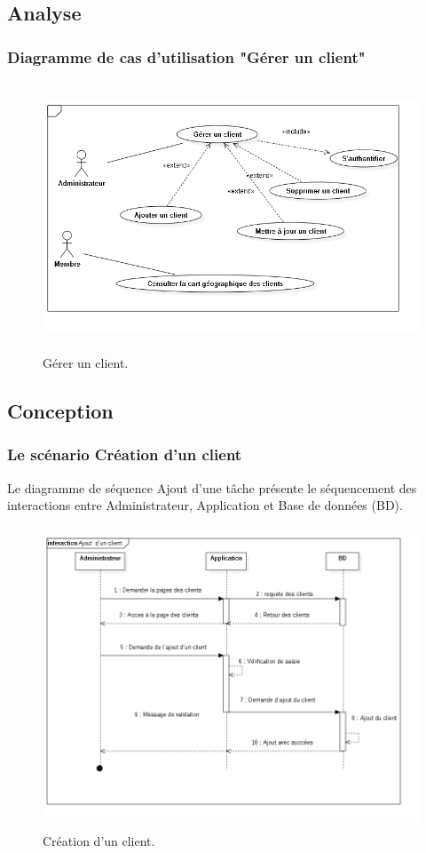 
\subsection{Analyse}
\subsubsection{ Diagramme de cas d'utilisation "G\'{e}rer un client"}
\begin{figure}[H]
\center
\includegraphics[width=13cm,height=8cm]{./figures/ucC.png}
\caption{G\'{e}rer un client.}
\end{figure}

\newpage
\subsection{Conception}
\subsubsection{Le sc\'{e}nario \guillemotleft{} Cr\'{e}ation d'un client\guillemotright{}}
Le diagramme de s\'{e}quence \guillemotleft{} Ajout d'une t\^{a}che \guillemotright{} pr\'{e}sente le s\'{e}quencement
des interactions entre Administrateur, Application et Base de donn\'{e}es (BD).

\begin{figure}[H]
\center
\includegraphics[width=14cm,height=9cm]{./figures/seq/F.png}
\caption{Cr\'{e}ation d'un client.}
\end{figure}



